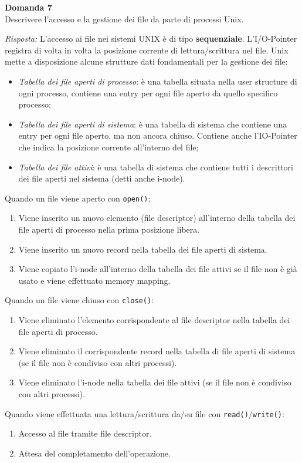 \documentclass{article}
\newenvironment{problem}[2][Domanda]
    { \begin{mdframed}[backgroundcolor=gray!20] \textbf{#1 #2} \\}
    {  \end{mdframed}}
\newenvironment{solution}
    {\textit{Risposta:}}
    {}
\begin{document}
\begin{problem}{7}
Descrivere l'accesso e la gestione dei file da parte di processi Unix.
\end{problem}
\begin{solution}
L’accesso ai file nei sistemi UNIX è di tipo \textbf{sequenziale}.
L'I/O-Pointer registra di volta in volta la posizione corrente di lettura/scrittura nel file.
\newline
\newline
Unix mette a disposizione alcune strutture dati fondamentali per la gestione dei file:
\begin{itemize}
    \item \emph{Tabella dei file aperti di processo}: è una tabella situata nella user structure di ogni processo, contiene una entry per ogni file aperto da quello specifico processo;
    \item \emph{Tabella dei file aperti di sistema}: è una tabella di sistema che contiene una entry per ogni file aperto, ma non ancora chiuso. Contiene anche l’IO-Pointer che indica la posizione corrente all’interno del file;
    \item \emph{Tabella dei file attivi}: è una tabella di sistema che contiene tutti i descrittori dei file aperti nel sistema (detti anche i-node).
\end{itemize}
Quando un file viene aperto con \texttt{open()}:
\begin{enumerate}
    \item Viene inserito un nuovo elemento (file descriptor) all’interno della tabella dei file aperti di  processo nella prima posizione libera.
    \item Viene inserito un nuovo record nella tabella dei file aperti di sistema.
    \item Viene copiato l’i-node all’interno della tabella dei file attivi se il file non è già usato e viene effettuato memory mapping.
\end{enumerate}
Quando un file viene chiuso con \texttt{close()}:
\begin{enumerate}
    \item Viene eliminato l’elemento corrispondente al file descriptor nella tabella dei file aperti di processo.
    \item Viene eliminato il corrispondente record nella tabella di file aperti di sistema (se il file non è condiviso con altri processi).
    \item Viene eliminato l’i-node nella tabella dei file attivi (se il file non è condiviso con altri processi).
\end{enumerate}
Quando viene effettuata una lettura/scrittura da/su file con \texttt{read()}/\texttt{write()}:
\begin{enumerate}
    \item Accesso al file tramite file descriptor.
    \item Attesa del completamento dell’operazione.
\end{enumerate}
\end{solution}
\end{document}
